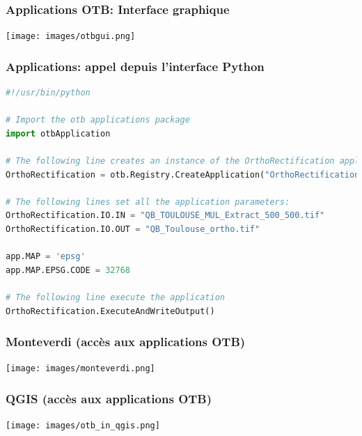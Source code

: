 \documentclass[8pt]{beamer}
\begin{document}
\begin{frame}[fragile]
\frametitle{Applications OTB: Interface graphique}
\begin{center}
\texttt{[image: images/otbgui.png]}
\end{center}
\end{frame}

\begin{frame}[fragile]
\frametitle{Applications: appel depuis l'interface Python}
\begin{lstlisting}[language=python,breaklines=true,breakatwhitespace=true,frame = tb,framerule = 0.25pt,fontadjust,backgroundcolor={\color{listlightgray}},basicstyle = {\ttfamily\tiny},keywordstyle = {\ttfamily\color{listkeyword}\textbf},identifierstyle = {\ttfamily},commentstyle = {\ttfamily\color{listcomment}\textit},stringstyle = {\ttfamily},showstringspaces = false,showtabs = false,numbers = none,numbersep = 6pt, numberstyle={\ttfamily\color{listnumbers}},tabsize = 2]
#!/usr/bin/python

# Import the otb applications package
import otbApplication

# The following line creates an instance of the OrthoRectification application
OrthoRectification = otb.Registry.CreateApplication("OrthoRectification")

# The following lines set all the application parameters:
OrthoRectification.IO.IN = "QB_TOULOUSE_MUL_Extract_500_500.tif"
OrthoRectification.IO.OUT = "QB_Toulouse_ortho.tif"

app.MAP = 'epsg'
app.MAP.EPSG.CODE = 32768

# The following line execute the application
OrthoRectification.ExecuteAndWriteOutput()
\end{lstlisting}
\end{frame}


\begin{frame}
\frametitle{Monteverdi (accès aux applications OTB)}
\begin{minipage}[t][6cm][t]{\textwidth}
\begin{center}
\texttt{[image: images/monteverdi.png]}
\end{center}
\end{minipage}
\end{frame}

\begin{frame}
  \frametitle{QGIS (accès aux applications OTB)}
\begin{minipage}[t][6cm][t]{\textwidth}
\begin{center}
\texttt{[image: images/otb\_in\_qgis.png]}
\end{center}
\end{minipage}
\end{frame}
\end{document}
